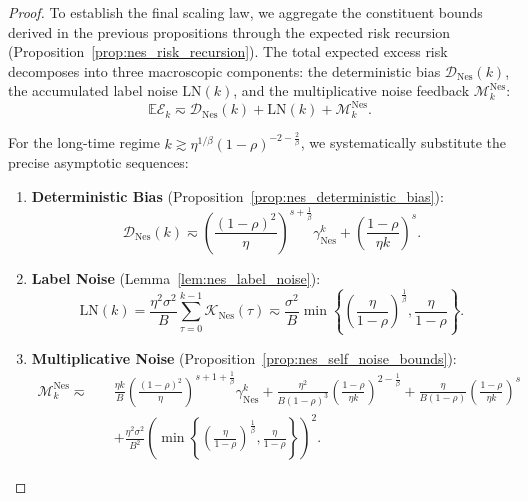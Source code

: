 \begin{proof}
To establish the final scaling law, we aggregate the constituent bounds derived in the previous propositions through the expected risk recursion (Proposition~\ref{prop:nes_risk_recursion}). The total expected excess risk decomposes into three macroscopic components: the deterministic bias $\mathcal{D}_{\mathrm{Nes}}(k)$, the accumulated label noise $\text{LN}(k)$, and the multiplicative noise feedback $\mathcal{M}_k^{\mathrm{Nes}}$:
\begin{equation*}
    \mathbb{E}\mathcal E_k \eqsim \mathcal{D}_{\mathrm{Nes}}(k) + \text{LN}(k) + \mathcal{M}_k^{\mathrm{Nes}}.
\end{equation*}

For the long-time regime $k \gtrsim \eta^{1/\beta}(1-\rho)^{-2-\frac{2}{\beta}}$, we systematically substitute the precise asymptotic sequences:
\begin{enumerate}
    \item \textbf{Deterministic Bias} (Proposition~\ref{prop:nes_deterministic_bias}):
    \begin{equation*}
        \mathcal{D}_{\mathrm{Nes}}(k) \eqsim \left(\frac{(1-\rho)^2}{\eta}\right)^{s+\frac{1}{\beta}} \gamma_{\mathrm{Nes}}^k + \left(\frac{1-\rho}{\eta k}\right)^s.
    \end{equation*}
    \item \textbf{Label Noise} (Lemma~\ref{lem:nes_label_noise}):
    \begin{equation*}
        \text{LN}(k) = \frac{\eta^2\sigma^2}{B}\sum_{\tau=0}^{k-1}\mathcal{K}_{\mathrm{Nes}}(\tau) \eqsim \frac{\sigma^2}{B} \min\left\{ \left(\frac{\eta}{1-\rho}\right)^{\frac1\beta}, \frac{\eta}{1-\rho} \right\}.
    \end{equation*}
    \item \textbf{Multiplicative Noise} (Proposition~\ref{prop:nes_self_noise_bounds}):
    \begin{align*}
        \mathcal M_k^{\mathrm{Nes}} \eqsim\quad &\frac{\eta k}{B} \left(\frac{(1-\rho)^2}{\eta}\right)^{s+1+\frac{1}{\beta}} \gamma_{\mathrm{Nes}}^k 
        + \frac{\eta^2}{B(1-\rho)^3}\left(\frac{1-\rho}{\eta k}\right)^{2-\frac1\beta} 
        + \frac{\eta}{B(1-\rho)}\left(\frac{1-\rho}{\eta k}\right)^s \\
        &+ \frac{\eta^2\sigma^2}{B^2} \left( \min\left\{\left(\frac{\eta}{1-\rho}\right)^{\frac1\beta}, \frac{\eta}{1-\rho}\right\} \right)^2.
    \end{align*}
\end{enumerate}


\end{proof}

